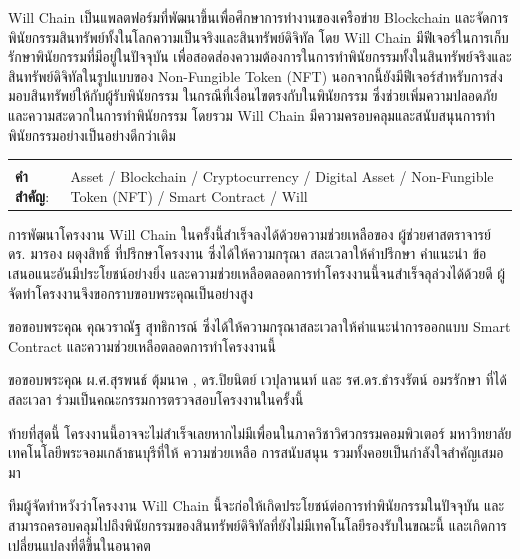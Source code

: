 \documentclass[12pt,oneside,openright,a4paper]{cpe-thai-project}
\begin{document}
Will Chain เป็นแพลตฟอร์มที่พัฒนาขึ้นเพื่อศึกษาการทำงานของเครือข่าย Blockchain และจัดการพินัยกรรมสินทรัพย์ทั้งในโลกความเป็นจริงและสินทรัพย์ดิจิทัล โดย Will Chain มีฟีเจอร์ในการเก็บรักษาพินัยกรรมที่มีอยู่ในปัจจุบัน เพื่อสอดส่องความต้องการในการทำพินัยกรรมทั้งในสินทรัพย์จริงและสินทรัพย์ดิจิทัลในรูปแบบของ Non-Fungible Token (NFT) นอกจากนี้ยังมีฟีเจอร์สำหรับการส่งมอบสินทรัพย์ให้กับผู้รับพินัยกรรม ในกรณีที่เงื่อนไขตรงกับในพินัยกรรม ซึ่งช่วยเพิ่มความปลอดภัยและความสะดวกในการทำพินัยกรรม โดยรวม Will Chain มีความครอบคลุมและสนับสนุนการทำพินัยกรรมอย่างเป็นอย่างดีกว่าเดิม
\begin{flushleft}
\begin{tabular*}{\textwidth}{@{}lp{}}
 & \\

\textbf{คำสำคัญ}: & Asset / Blockchain / Cryptocurrency / Digital Asset / Non-Fungible Token (NFT) /  Smart Contract / Will 
\end{tabular*}
\end{flushleft}
\endabstract


\preface
\tab การพัฒนาโครงงาน Will Chain ในครั้งนี้สําเร็จลงได้ด้วยความช่วยเหลือของ ผู้ช่วยศาสตราจารย์ ดร. มารอง ผดุงสิทธิ์ ที่ปรึกษาโครงงาน ซึ่งได้ให้ความกรุณา สละเวลาให้คําปรึกษา คําแนะนํา ข้อเสนอแนะอันมีประโยชน์อย่างยิ่ง และความช่วยเหลือตลอดการทําโครงงานนี้จนสําเร็จลุล่วงได้ด้วยดี ผู้จัดทําโครงงานจึงขอกราบขอบพระคุณเป็นอย่างสูง

\tab ขอขอบพระคุณ คุณวราณัฐ สุทธิการณ์ ซึ่งได้ให้ความกรุณาสละเวลาให้คําแนะนําการออกแบบ Smart Contract และความช่วยเหลือตลอดการทำโครงงานนี้

\tab ขอขอบพระคุณ ผ.ศ.สุรพนธ์ ตุ้มนาค , ดร.ปิยนิตย์ เวปุลานนท์ และ รศ.ดร.ธํารงรัตน์ อมรรักษา ที่ได้สละเวลา
ร่วมเป็นคณะกรรมการตรวจสอบโครงงานในครั้งนี้ 

\tab ท้ายที่สุดนี้ โครงงานนี้อาจจะไม่สําเร็จเลยหากไม่มีเพื่อนในภาควิชาวิศวกรรมคอมพิวเตอร์ มหาวิทยาลัยเทคโนโลยีพระจอมเกล้าธนบุรีที่ให้ 
ความช่วยเหลือ การสนับสนุน รวมทั้งคอยเป็นกําลังใจสําคัญเสมอมา 

\tab ทีมผู้จัดทำหวังว่าโครงงาน Will Chain นี้จะก่อให้เกิดประโยชน์ต่อการทำพินัยกรรมในปัจจุบัน และสามารถครอบคลุมไปถึงพินัยกรรมของสินทรัพย์ดิจิทัลที่ยังไม่มีเทคโนโลยีรองรับในขณะนี้ และเกิดการเปลี่ยนแปลงที่ดีขึ้นในอนาคต

\tableofcontents                    
\listoftables
\listoffigures                      
\end{document}

